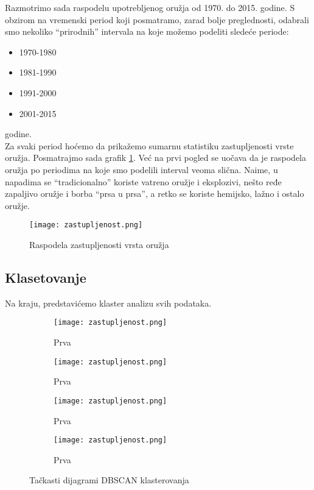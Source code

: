 \documentclass[a4paper]{article}
\begin{document}
Razmotrimo sada raspodelu upotrebljenog oružja od 1970. do 2015. godine. S obzirom na vremenski period koji posmatramo, zarad bolje preglednosti, odabrali smo nekoliko ``prirodnih'' intervala na koje možemo podeliti sledeće periode: 
\begin{itemize}
	\item 1970-1980
	\item 1981-1990
	\item 1991-2000
	\item 2001-2015\\ 
\end{itemize} 
godine.\\
Za svaki period hoćemo da prikažemo sumarnu statistiku zastupljenosti vrste oružja. Posmatrajmo sada grafik \ref{fig:oruzja}. Već na prvi pogled se uočava da je raspodela oružja po periodima na koje smo podelili interval veoma slična. Naime, u napadima se ``tradicionalno'' koriste vatreno oružje i eksplozivi, nešto ređe zapaljivo oružje i borba ``prsa u prsa'', a retko se koriste hemijsko, lažno i ostalo oružje.

\begin{figure}[h!]
\centering
\texttt{[image: zastupljenost.png]}
\caption{Raspodela zastupljenosti vrsta oružja}
\label{fig:oruzja}
\end{figure} 

\subsection{Klasetovanje}

Na kraju, predstavićemo klaster analizu svih podataka. 
\begin{figure}[h!]
\centering
\begin{subfigure}[a]{0.4\textwidth}
	\texttt{[image: zastupljenost.png]}
	\caption{Prva}
\end{subfigure} 
\begin{subfigure}[b]{0.4\textwidth}
	\texttt{[image: zastupljenost.png]}
	\caption{Prva}
\end{subfigure} 
\begin{subfigure}[c]{0.4\textwidth}
	\texttt{[image: zastupljenost.png]}
	\caption{Prva}
\end{subfigure} 
\begin{subfigure}[d]{0.4\textwidth}
	\texttt{[image: zastupljenost.png]}
	\caption{Prva}
\end{subfigure} 
\caption{Tačkasti dijagrami DBSCAN klasterovanja}
\end{figure} 
\end{document}
